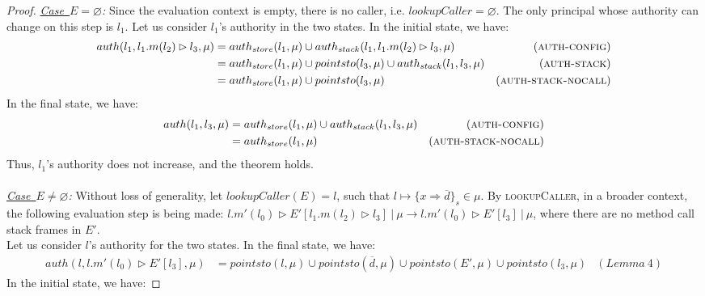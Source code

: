 \documentclass{llncs}
\begin{document}
\begin{proof}
\noindent\textit{\mbox{\underline{Case $E = \varnothing$}}:} Since the evaluation context is empty, there is no caller, i.e. $lookupCaller = \varnothing$. The only principal whose authority can change on this step is $l_1$. Let us consider $l_1$'s authority in the two states. In the initial state, we have:
\begin{align*}
auth(l_1, l_1.m(l_2) \rhd l_3, \mu) &= auth_{store}(l_1, \mu) \cup auth_{stack}(l_1, l_1.m(l_2) \rhd l_3, \mu) & (\textsc{auth-config})\\
&= auth_{store}(l_1, \mu) \cup pointsto(l_3, \mu) \cup auth_{stack}(l_1, l_3, \mu) & (\textsc{auth-stack})\\
&= auth_{store}(l_1, \mu) \cup pointsto(l_3, \mu) & (\textsc{auth-stack-nocall})
\end{align*}
In the final state, we have:
\begin{align*}
auth(l_1, l_3, \mu) &= auth_{store}(l_1, \mu) \cup auth_{stack}(l_1, l_3, \mu) & (\textsc{auth-config})\\
&= auth_{store}(l_1, \mu) & (\textsc{auth-stack-nocall})
\end{align*}
Thus, $l_1$'s authority does not increase, and the theorem holds.\\\\

\noindent\textit{\mbox{\underline{Case $E \not= \varnothing$}}:} Without loss of generality, let \mbox{$lookupCaller(E) = l$}, such that \mbox{$l \mapsto \{ x \Rightarrow \overline{d} \}_{s} \in \mu$}. By \textsc{lookupCaller}, in a broader context, the following evaluation step is being made: \mbox{$l.m'(l_0) \rhd E'[l_1.m(l_2) \rhd l_3]~|~\mu \longrightarrow l.m'(l_0) \rhd E'[l_3]~|~\mu$}, where there are no method call stack frames in $E'$.\\

\noindent Let us consider $l$'s authority for the two states. In the final state, we have:
\begin{align*}
auth(l, l.m'(l_0) \rhd E'[l_3], \mu) &= pointsto(l, \mu) \cup pointsto(\overline{d}, \mu) \cup pointsto(E', \mu) \cup pointsto(l_3, \mu) & (Lemma~4)
\end{align*}
In the initial state, we have:


\end{proof}
\end{document}
